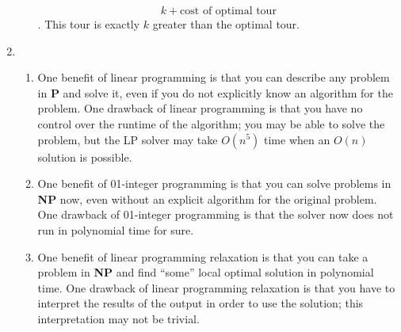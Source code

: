 \documentclass[12pt,letterpaper]{article}
\begin{document}
\begin{enumerate}
\begin{enumerate}
          \[
            k + \text{cost of optimal tour}
          \].
          This tour is exactly $k$ greater than the optimal tour.
      \end{enumerate}
    \item
      \begin{enumerate}
        \item
          One benefit of linear programming is that
          you can describe any problem in \textbf{P} and solve it,
          even if you do not explicitly know an algorithm for the problem.
          One drawback of linear programming is that
          you have no control over the runtime of the algorithm;
          you may be able to solve the problem,
          but the LP solver may take $O(n^5)$ time when an $O(n)$ solution is possible.
        \item
          One benefit of 01-integer programming is that
          you can solve problems in \textbf{NP} now,
          even without an explicit algorithm for the original problem.
          One drawback of 01-integer programming is that
          the solver now does not run in polynomial time for sure.
        \item
          One benefit of linear programming relaxation is that
          you can take a problem in \textbf{NP} and
          find ``some'' local optimal solution in polynomial time.
          One drawback of linear programming relaxation is that
          you have to interpret the results of the output in order to use the solution;
          this interpretation may not be trivial.
      \end{enumerate}
  \end{enumerate}
\end{document}
